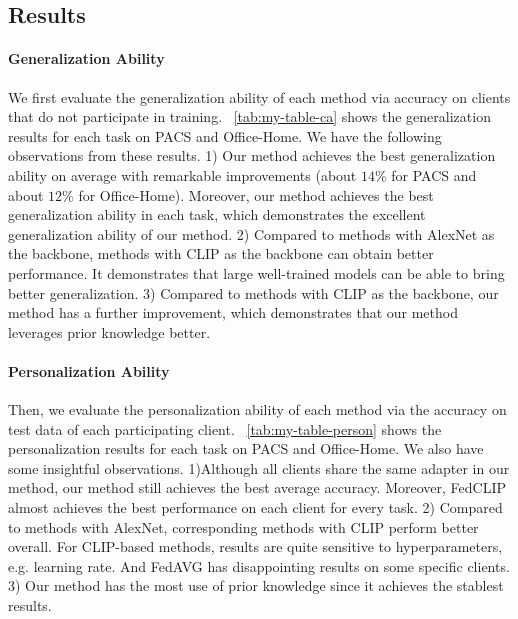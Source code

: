 \documentclass[11pt]{article}
\newcommand{\method}{FedCLIP\xspace}
\newcommand{\wjdd}[1]{\todo[linecolor=cyan,backgroundcolor=cyan!25,bordercolor=cyan,size=\scriptsize]{(WJD): #1}}
\begin{document}
\subsection{Results}
\paragraph{Generalization Ability}

We first evaluate the generalization ability of each method via accuracy on clients that do not participate in training. 
\tablename~\ref{tab:my-table-ca} shows the generalization results for each task on PACS and Office-Home.
We have the following observations from these results.
1) Our method achieves the best generalization ability on average with remarkable improvements (about $14\%$ for PACS and about $12\%$ for Office-Home).
Moreover, our method achieves the best generalization ability in each task, which demonstrates the excellent generalization ability of our method.
2) Compared to methods with AlexNet as the backbone, methods with CLIP as the backbone can obtain better performance.
It demonstrates that large well-trained models can be able to bring better generalization.
3) Compared to methods with CLIP as the backbone, our method has a further improvement, which demonstrates that our method leverages prior knowledge better.%

\paragraph{Personalization Ability}

Then, we evaluate the personalization ability of each method via the accuracy on test data of each participating client.
\tablename~\ref{tab:my-table-person} shows the personalization results for each task on PACS and Office-Home.
We also have some insightful observations.
1)Although all clients share the same adapter in our method, our method still achieves the best average accuracy.
Moreover, \method almost achieves the best performance on each client for every task.
2) Compared to methods with AlexNet, corresponding methods with CLIP perform better overall.
For CLIP-based methods, results are quite sensitive to hyperparameters, e.g. learning rate.
And FedAVG has disappointing results on some specific clients.
3) Our method has the most use of prior knowledge since it achieves the stablest results.
\end{document}
